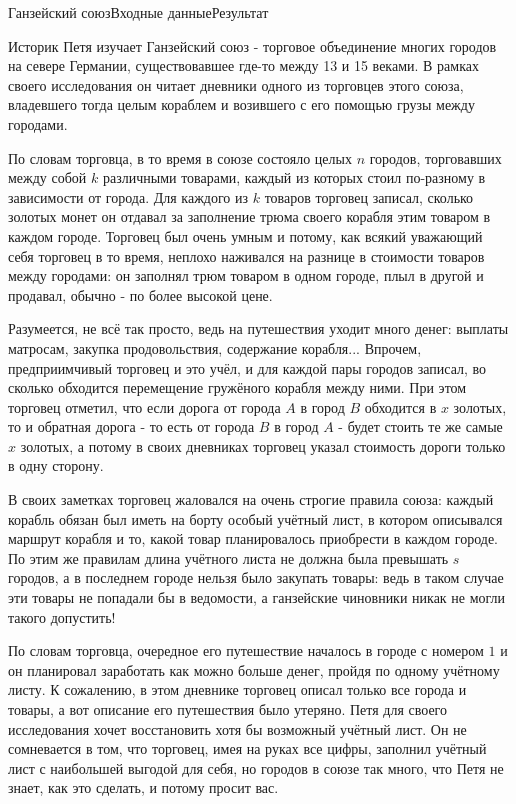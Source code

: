 \begin{problem}{Ганзейский союз}{Входные данные}{Результат}{}

Историк Петя изучает Ганзейский союз - торговое объединение многих городов на севере Германии, существовавшее где-то между 13 и 15 веками.
В рамках своего исследования он читает дневники одного из торговцев этого союза, владевшего тогда целым кораблем и возившего с его помощью грузы между городами.

По словам торговца, в то время в союзе состояло целых $n$ городов, торговавших между собой $k$ различными товарами, каждый из которых стоил по-разному в зависимости от города.
Для каждого из $k$ товаров торговец записал, сколько золотых монет он отдавал за заполнение трюма своего корабля этим товаром в каждом городе.
Торговец был очень умным и потому, как всякий уважающий себя торговец в то время, неплохо наживался на разнице в стоимости товаров между городами: он заполнял трюм товаром в одном городе, плыл в другой и продавал, обычно - по более высокой цене.

Разумеется, не всё так просто, ведь на путешествия уходит много денег: выплаты матросам, закупка продовольствия, содержание корабля...
Впрочем, предприимчивый торговец и это учёл, и для каждой пары городов записал, во сколько обходится перемещение гружёного корабля между ними.
При этом торговец отметил, что если дорога от города $A$ в город $B$ обходится в $x$ золотых, то и обратная дорога - то есть от города $B$ в город $A$ - будет стоить те же самые $x$ золотых, а потому в своих дневниках торговец указал стоимость дороги только в одну сторону.

В своих заметках торговец жаловался на очень строгие правила союза: каждый корабль обязан был иметь на борту особый учётный лист, в котором описывался маршрут корабля и то, какой товар планировалось приобрести в каждом городе.
По этим же правилам длина учётного листа не должна была превышать $s$ городов, а в последнем городе нельзя было закупать товары: ведь в таком случае эти товары не попадали бы в ведомости, а ганзейские чиновники никак не могли такого допустить!

По словам торговца, очередное его путешествие началось в городе с номером $1$ и он планировал заработать как можно больше денег, пройдя по одному учётному листу.
К сожалению, в этом дневнике торговец описал только все города и товары, а вот описание его путешествия было утеряно. Петя для своего исследования хочет восстановить хотя бы возможный учётный лист.
Он не сомневается в том, что торговец, имея на руках все цифры, заполнил учётный лист с наибольшей выгодой для себя, но городов в союзе так много, что Петя не знает, как это сделать, и потому просит вас.


\end{problem}
